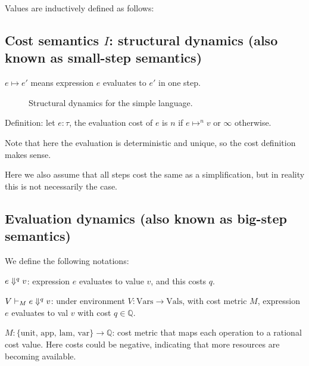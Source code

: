 \documentclass[ manuscript, review,screen, nonacm]{acmart}
\begin{document}
Values are inductively defined as follows:





\subsection{ Cost semantics $I$: structural dynamics (also known as small-step semantics)}

$e \mapsto e'$ means expression $e$ evaluates to $e'$ in one step.

\begin{figure}[htb]
    \caption{Structural dynamics for the simple language.}
    \label{fig:small-step}
\end{figure}



Definition: let $e:\tau$, the evaluation cost of $e$ is $n$ if $e \mapsto ^n v$ or $\infty$ otherwise.

Note that here the evaluation is deterministic and unique, so the cost definition makes sense.

Here we also assume that all steps cost the same as a simplification, but in reality this is not necessarily the case.

\subsection{Evaluation dynamics (also known as big-step semantics)}

We define the following notations:

$e \Downarrow^{q} v$: expression $e$ evaluates to value $v$, and this costs $q$.


$V \vdash_{M} e \Downarrow^{q}v$: under environment $V: \mathrm{Vars} \rightarrow \mathrm{Vals}$, with cost metric $M$, expression $e$ evaluates to val $v$ with cost $q \in \mathbb{Q}$.

$M: \{ \text{unit, app, lam, var} \} \rightarrow \mathbb{Q}$: cost metric that maps each operation to a rational cost value. Here costs could be negative, indicating that more resources are becoming available.
\end{document}
